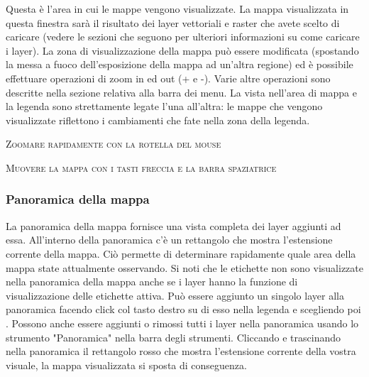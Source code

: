Questa è l’area in cui le mappe vengono visualizzate. La mappa visualizzata in questa finestra sarà
il risultato dei layer vettoriali e raster che avete scelto di caricare (vedere le sezioni che seguono
per ulteriori informazioni su come caricare i layer). La zona di visualizzazione della mappa può
essere modificata (spostando la messa a fuoco dell’esposizione della mappa ad un’altra regione) ed
è possibile effettuare operazioni di zoom in ed out (+ e -). Varie altre operazioni sono descritte nella
sezione relativa alla barra dei menu. La vista nell’area di mappa e la legenda sono strettamente
legate l’una all’altra: le mappe che vengono visualizzate riflettono i cambiamenti che fate nella zona
della legenda.  

\begin{Tip}\caption{\textsc{Zoomare rapidamente con la rotella del mouse}}
\end{Tip}

\begin{Tip}\caption{\textsc{Muovere la mappa con i tasti freccia e la barra
spaziatrice}}
\end{Tip}

\subsubsection{Panoramica della mappa}\label{label_mapoverview}

La panoramica della mappa fornisce una vista completa dei layer aggiunti ad
essa. All’interno della panoramica c’è un rettangolo che mostra l’estensione
corrente della mappa. Ciò permette di determinare rapidamente quale area
della mappa state attualmente osservando. Si noti che le etichette non sono
visualizzate nella panoramica della mappa anche se i layer hanno la funzione di visualizzazione
delle etichette attiva.
Può essere aggiunto un singolo layer alla panoramica facendo click col tasto destro su di esso nella legenda e scegliendo poi . Possono anche essere aggiunti o rimossi tutti i layer nella
panoramica usando lo strumento "Panoramica" nella barra
degli strumenti. Cliccando e trascinando nella panoramica il rettangolo rosso che mostra
l'estensione corrente della vostra visuale, la mappa visualizzata si sposta di
conseguenza.

